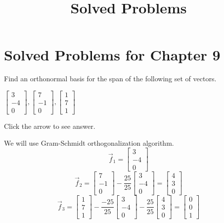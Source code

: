 \documentclass{ximera}
\title{Solved Problems} \license{CC BY-NC-SA 4.0}
\begin{document}
\begin{abstract}
\end{abstract}
\maketitle

\section*{Solved Problems for Chapter 9}

\begin{problem}\label{prob:orth_basis1}
    Find an orthonormal basis for the span of the following set of
vectors.


$\left[
\begin{array}{r}
 3 \\
-4 \\
0
\end{array}
\right] ,\left[
\begin{array}{r}
 7 \\
-1 \\
0
\end{array}
\right] ,\left[
\begin{array}{r}
 1 \\
7 \\
1
\end{array}
\right] $

Click the arrow to see answer.
\begin{expandable}{}{}
We will use Gram-Schmidt orthogonalization algorithm.
$$\vec{f}_1=\begin{bmatrix}3\\-4\\0\end{bmatrix}$$
$$\vec{f}_2=\begin{bmatrix}7\\-1\\0\end{bmatrix}-\frac{25}{25}\begin{bmatrix}3\\-4\\0\end{bmatrix}=\begin{bmatrix}4\\3\\0\end{bmatrix}$$
$$\vec{f}_3=\begin{bmatrix}1\\7\\1\end{bmatrix}-\frac{-25}{25}\begin{bmatrix}3\\-4\\0\end{bmatrix}-\frac{25}{25}\begin{bmatrix}4\\3\\0\end{bmatrix}=\begin{bmatrix}0\\0\\1\end{bmatrix}$$


\end{expandable}
\end{problem}
\end{document}
